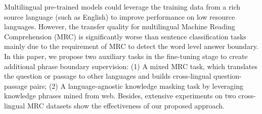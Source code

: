 Multilingual pre-trained models could leverage the training data from a rich source language (such as English) to improve performance on low resource languages. However, the transfer quality for multilingual Machine Reading Comprehension (MRC) is significantly worse than sentence classification tasks mainly due to the requirement of MRC to detect the word level answer boundary. In this paper, we propose two auxiliary tasks in the fine-tuning stage to create additional phrase boundary supervision: (1) A mixed MRC task, which translates the question or passage to other languages and builds cross-lingual question-passage pairs; (2) A language-agnostic knowledge masking task by leveraging knowledge phrases mined from web. Besides, extensive experiments on two cross-lingual MRC datasets show the effectiveness of our proposed approach.
